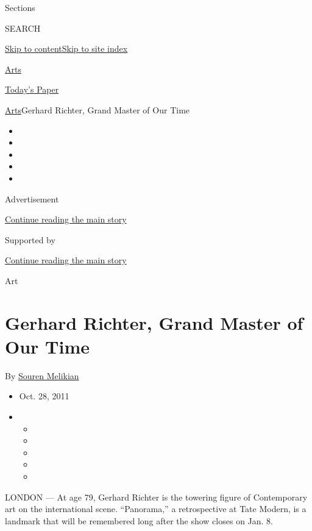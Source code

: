 Sections

SEARCH

\protect\hyperlink{site-content}{Skip to
content}\protect\hyperlink{site-index}{Skip to site index}

\href{https://www.nytimes3xbfgragh.onion/section/arts}{Arts}

\href{https://myaccount.nytimes3xbfgragh.onion/auth/login?response_type=cookie\&client_id=vi}{}

\href{https://www.nytimes3xbfgragh.onion/section/todayspaper}{Today's
Paper}

\href{/section/arts}{Arts}\textbar{}Gerhard Richter, Grand Master of Our
Time

\begin{itemize}
\item
\item
\item
\item
\item
\end{itemize}

Advertisement

\protect\hyperlink{after-top}{Continue reading the main story}

Supported by

\protect\hyperlink{after-sponsor}{Continue reading the main story}

Art

\hypertarget{gerhard-richter-grand-master-of-our-time}{%
\section{Gerhard Richter, Grand Master of Our
Time}\label{gerhard-richter-grand-master-of-our-time}}

By \href{https://www.nytimes3xbfgragh.onion/by/souren-melikian}{Souren
Melikian}

\begin{itemize}
\item
  Oct. 28, 2011
\item
  \begin{itemize}
  \item
  \item
  \item
  \item
  \item
  \end{itemize}
\end{itemize}

LONDON --- At age 79, Gerhard Richter is the towering figure of
Contemporary art on the international scene. ``Panorama,'' a
retrospective at Tate Modern, is a landmark that will be remembered long
after the show closes on Jan. 8.

